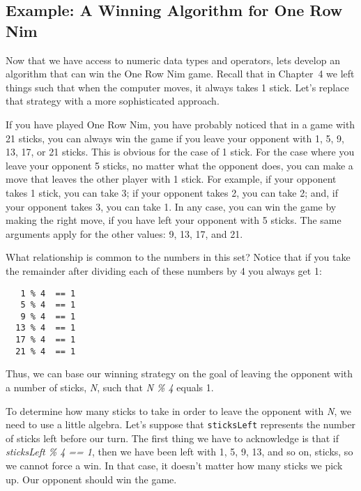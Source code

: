 

\subsection{Example: A Winning Algorithm for One Row Nim}

Now that we have access to numeric data types and operators, lets
develop an algorithm that can win the One Row Nim game. Recall that in
Chapter~4 we left things such that when the computer moves, it always
takes 1 stick. Let's replace that strategy with a more sophisticated
approach.

If you have played One Row Nim, you have probably noticed that in a
game with 21 sticks, you can always win the game if you leave your
opponent with 1, 5, 9, 13, 17, or 21 sticks.  This is obvious for the
case of 1 stick. For the case where you leave your opponent 5 sticks,
no matter what the opponent does, you can make a move that leaves the
other player with 1 stick. For example, if your opponent takes 1
stick, you can take 3; if your opponent takes 2, you can take 2; and,
if your opponent takes 3, you can take 1. In any case, you can win the
game by making the right move, if you have left your opponent with 5
sticks. The same arguments apply for the other values: 9, 13, 17, and
21.

What relationship is common to the numbers in this set? Notice
that if you take the remainder after dividing each of these numbers
by 4 you always get 1:

\begin{jjjlisting}
\begin{lstlisting}
   1 % 4  == 1
   5 % 4  == 1
   9 % 4  == 1
  13 % 4  == 1
  17 % 4  == 1
  21 % 4  == 1
\end{lstlisting}
\end{jjjlisting}

\noindent Thus, we can base our winning strategy on the goal of
leaving the opponent with a number of sticks, {\it N}, such that {\it
N \% 4} equals 1.  

To determine how many sticks to take in order to leave the opponent
with {\it N}, we need to use a little algebra.  Let's suppose that
{\tt sticksLeft} represents the number of sticks left before our
turn. The first thing we have to acknowledge is that if {\it sticksLeft \%
4 == 1}, then we have been left with 1, 5, 9, 13, and so on, sticks,
so we cannot force a win.  In that case, it doesn't matter how many
sticks we pick up. Our opponent should win the game.

